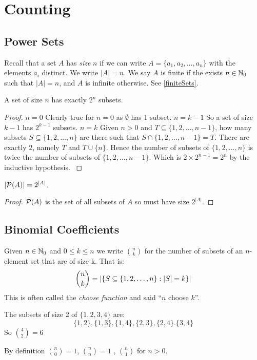 \documentclass[../main.tex]{subfiles}
\begin{document}
\section{Counting}
\subsection{Power Sets}
\begin{remark}[Reminder]
  Recall that a set $A$ has \textit{size} $n$ if we can write $A = \{a_1, a_2, \ldots, a_n\}$ with the elements $a_i$ distinct.
  We write $|A| = n$.
  We say $A$ is finite if the exists $n \in \mathbb{N}_0$ such that $|A| = n$, and $A$ is infinite otherwise.
  See \cref{finiteSets}.
\end{remark}
\begin{proposition}
  A set of size $n$ has exactly $2^{n}$ subsets.
\end{proposition}
\begin{proof}
  \induction
  {$n = 0$}{
    Clearly true for $n = 0$ as $\emptyset$ has 1 subset.
  }
  {$n = k - 1$}{
    So a set of size $k - 1$ has $2^{k - 1}$ subsets.
  }
  {$n = k$}{
    Given $n > 0$ and $T \subseteq \{1, 2, \ldots, n - 1\}$, how many subsets $S \subseteq \{1, 2, \ldots, n\}$ are there such that $S \cap \{1, 2, \ldots, n - 1\} = T$.
    There are exactly 2, namely $T$ and $T \cup \{n\}$.
    Hence the number of subsets of $\{1, 2, \ldots, n\}$ is twice the number of subsets of $\{1, 2, \ldots, n - 1\}$. Which is $2 \times 2^{n - 1} = 2^{n}$ by the inductive hypothesis.
  }
\end{proof}
\begin{corollary}
  $|\mathcal{P}(A)| = 2^{|A|}$.
\end{corollary}
\begin{proof}
  $\mathcal{P}(A)$ is the set of all subsets of $A$ so must have size $2^{|A|}$.
\end{proof}

\subsection{Binomial Coefficients}
\begin{definition}
  Given $n \in \mathbb{N}_0$ and $0 \leq k \leq n$ we write $\binom{n}{k}$ for the number of subsets of an $n$-element set that are of size k.
  That is:
  \[
    \binom{n}{k} = \left\lvert \{S \subseteq \{1, 2, \ldots, n\} : |S| = k\} \right\rvert
  \]
  This is often called the \textit{choose function} and said ``$n$ choose $k$''.
\end{definition}
\begin{example}
  The subsets of size 2 of $\{1, 2, 3, 4\}$ are:
  \[
    \{1, 2\}, \{1, 3\}, \{1, 4\}, \{2, 3\}, \{2, 4\}. \{3, 4\}
  \]
  So $\binom{4}{2} = 6$
\end{example}
By definition $\binom{n}{0} = 1$, $\binom{n}{n} = 1$ , $\binom{n}{1}$ for $n > 0$.
\end{document}
